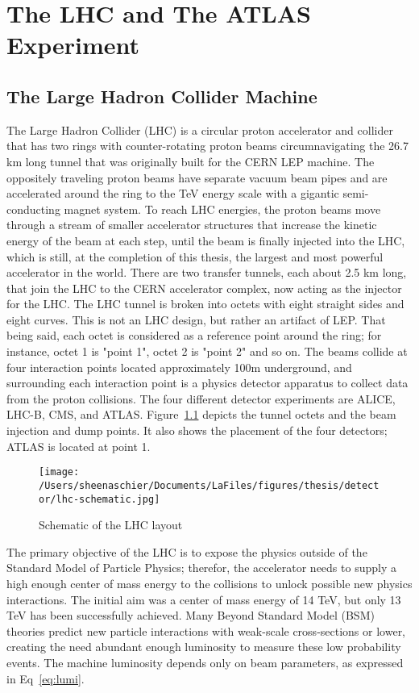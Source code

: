 \chapter{The LHC and The ATLAS Experiment}
\label{ch:detector}
\section{The Large Hadron Collider Machine}
\label{sec:LHC}

The Large Hadron Collider (LHC) is a circular proton accelerator and collider that has two rings with counter-rotating proton beams circumnavigating the 26.7 km long tunnel that was originally built for the CERN LEP machine.  The oppositely traveling proton beams have separate vacuum beam pipes and are accelerated around the ring to the TeV energy scale with a gigantic semi-conducting magnet system.  To reach LHC energies, the proton beams move through a stream of smaller accelerator structures that increase the kinetic energy of the beam at each step, until the beam is finally injected into the LHC, which is still, at the completion of this thesis, the largest and most powerful accelerator in the world.  There are two transfer tunnels, each about 2.5 km long, that join the LHC to the CERN accelerator complex, now acting as the injector for the LHC.  The LHC tunnel is broken into octets with eight straight sides and eight curves.  This is not an LHC design, but rather an artifact of LEP.   That being said, each octet is considered as a reference point around the ring; for instance, octet 1 is "point 1", octet 2 is "point 2" and so on.  The beams collide at four interaction points located approximately 100m underground, and surrounding each interaction point is a physics detector apparatus to collect data from the proton collisions.  The four different detector experiments are ALICE, LHC-B, CMS, and ATLAS.  Figure~\ref{fig:lhc} depicts the tunnel octets and the beam injection and dump points.  It also shows the placement of the four detectors; ATLAS is located at point 1.

  \begin{figure}[tbp]
    \centering
 \texttt{[image: /Users/sheenaschier/Documents/LaFiles/figures/thesis/detector/lhc-schematic.jpg]}
    \caption{Schematic of the LHC layout}
   \label{fig:lhc}
 \end{figure}
The primary objective of the LHC is to expose the physics outside of the Standard Model of Particle Physics; therefor, the accelerator needs to supply a high enough center of mass energy to the collisions to unlock possible new physics interactions.  The initial aim was a center of mass energy of 14 TeV, but only 13 TeV has been successfully achieved.  Many Beyond Standard Model (BSM) theories predict new particle interactions with weak-scale cross-sections or lower, creating the need abundant enough luminosity to measure these low probability events.  The machine luminosity depends only on beam parameters, as expressed in Eq~\ref{eq:lumi}.

